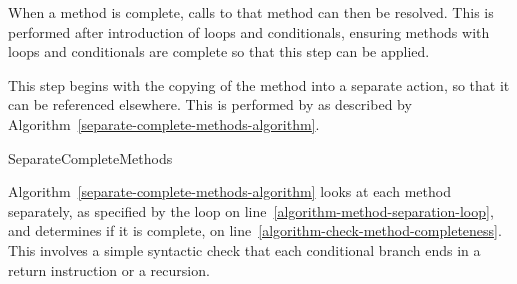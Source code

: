 When a method is complete, calls to that method can then be resolved.
This is performed after introduction of loops and conditionals,
ensuring methods with loops and conditionals are complete so that this
step can be applied.

This step begins with the copying of the method into a separate
action, so that it can be referenced elsewhere.
This is performed by as described by
Algorithm~\ref{separate-complete-methods-algorithm}.
\begin{algorithm}
  \begin{algorithmic}[1]
     \label{algorithm-method-separation-loop}
     \label{algorithm-check-method-completeness}
    \State {}
    \label{algorithm-introduce-class-information}
    \State {} \label{algorithm-introduce-method-action}
    \State {} \label{algorithm-copy-method-action}
    \EndIf
    \EndFor
  \end{algorithmic}
  \caption{SeparateCompleteMethods}
  \label{separate-complete-methods-algorithm}
\end{algorithm}

Algorithm~\ref{separate-complete-methods-algorithm} looks at each
method separately, as specified by the loop on
line~\ref{algorithm-method-separation-loop}, and determines if it is
complete, on line~\ref{algorithm-check-method-completeness}.
This involves a simple syntactic check that each conditional branch
ends in a return instruction or a recursion.

